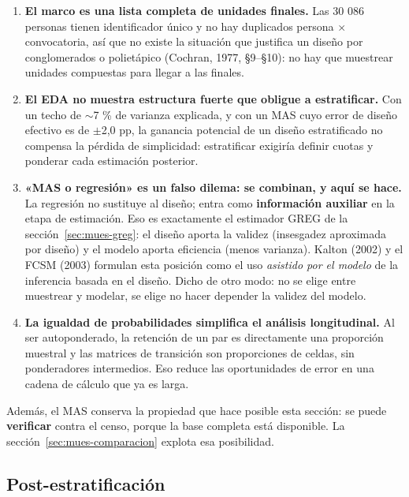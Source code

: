 \begin{enumerate}
  \item \textbf{El marco es una lista completa de unidades finales.} Las 30 086
        personas tienen identificador único y no hay duplicados persona $\times$
        convocatoria, así que no existe la situación que justifica un diseño por
        conglomerados o polietápico (Cochran, 1977, §9--§10): no hay que
        muestrear unidades compuestas para llegar a las finales.
  \item \textbf{El EDA no muestra estructura fuerte que obligue a estratificar.}
        Con un techo de $\sim$7 \% de varianza explicada, y con un MAS cuyo error
        de diseño efectivo es de $\pm$2,0 pp, la ganancia potencial de un diseño
        estratificado no compensa la pérdida de simplicidad: estratificar
        exigiría definir cuotas y ponderar cada estimación posterior.
  \item \textbf{«MAS o regresión» es un falso dilema: se combinan, y aquí se
        hace.} La regresión no sustituye al diseño; entra como
        \textbf{información auxiliar} en la etapa de estimación. Eso es
        exactamente el estimador GREG de la sección~\ref{sec:mues-greg}: el
        diseño aporta la validez (insesgadez aproximada por diseño) y el modelo
        aporta eficiencia (menos varianza). Kalton (2002) y el FCSM (2003)
        formulan esta posición como el uso \emph{asistido por el modelo} de la
        inferencia basada en el diseño. Dicho de otro modo: no se elige entre
        muestrear y modelar, se elige no hacer depender la validez del modelo.
  \item \textbf{La igualdad de probabilidades simplifica el análisis
        longitudinal.} Al ser autoponderado, la retención de un par es
        directamente una proporción muestral y las matrices de transición son
        proporciones de celdas, sin ponderadores intermedios. Eso reduce las
        oportunidades de error en una cadena de cálculo que ya es larga.
\end{enumerate}

Además, el MAS conserva la propiedad que hace posible esta sección: se puede
\textbf{verificar} contra el censo, porque la base completa está disponible. La
sección~\ref{sec:mues-comparacion} explota esa posibilidad.

\subsection{Post-estratificación}
\label{sec:mues-postest}

